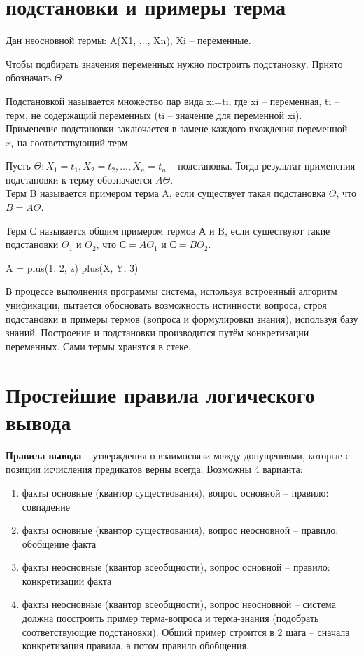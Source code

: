 \documentclass[12pt]{report}
\begin{document}
\section*{подстановки и примеры терма}


Дан неосновной термы: A(X1, ..., Xn), Xi -- переменные.

Чтобы подбирать значения переменных нужно построить подстановку. Прнято обозначать $\Theta$

Подстановкой называется множество пар  вида {xi=ti}, где xi -- переменная, ti  -- терм, не содержащий переменных (ti -- значение для переменной xi). \\

Применение подстановки заключается в замене каждого вхождения переменной $x_i$ на соответствующий терм. 

Пусть $\Theta: {X}_{1} = {t}_{1} , {X}_{2} = {t}_{2},… , {X}_{n} = {t}_{n}$ -- подстановка. Тогда результат применения подстановки к терму обозначается $A\Theta$. \\


Терм B называется примером терма A, если существует такая подстановка $\Theta$, что $B = A\Theta$.

Терм С называется общим примером термов А и B, если существуют такие подстановки $\Theta_1$ и $\Theta_2$, что $С = A\Theta_1$ и $С = B\Theta_2$.


A = plus(1, 2, z)
plus(X, Y, 3)



В процессе выполнения программы система, используя встроенный алгоритм унификации, пытается обосновать возможность истинности вопроса, строя подстановки и примеры термов (вопроса и формулировки знания), используя базу знаний. Построение и подстановки производится путём конкретизации переменных. Сами термы хранятся в стеке.




\section*{Простейшие правила логического вывода}


\textbf{Правила вывода} -- утверждения о взаимосвязи между допущениями, которые с позиции исчисления предикатов верны всегда. Возможны 4 варианта:

\begin{enumerate}
    \item факты основные (квантор существования), вопрос основной -- правило: совпадение
    \item факты основные (квантор существования), вопрос неосновной -- правило: обобщение факта
    \item факты неосновные (квантор всеобщности), вопрос основной -- правило: конкретизации факта
    \item факты неосновные (квантор всеобщности), вопрос неосновной -- система должна посстроить пример терма-вопроса и терма-знания (подобрать соответствующие подстановки). Общий пример строится в 2 шага -- сначала конкретизация правила, а потом правило обобщения.
\end{enumerate}
\end{document}
